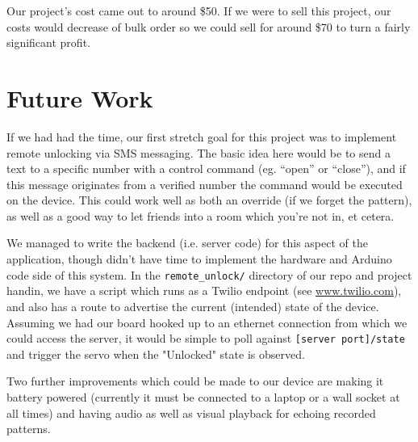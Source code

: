 \documentclass[11pt]{article}			%
\begin{document}
Our project's cost came out to around \$50. If we were to sell this project, our costs would decrease of bulk order so we could sell for around \$70 to turn a fairly significant profit.

\section{Future Work}

If we had had the time, our first stretch goal for this project was to implement remote unlocking via SMS messaging. The basic idea here would be to send a text to a specific number with a control command (eg. ``open'' or ``close''), and if this message originates from a verified number the command would be executed on the device. This could work well as both an override (if we forget the pattern), as well as a good way to let friends into a room which you're not in, et cetera.

We managed to write the backend (i.e. server code) for this aspect of the application, though didn't have time to implement the hardware and Arduino code side of this system. In the \verb|remote_unlock/| directory of our repo and project handin, we have a script which runs as a Twilio endpoint (see \url{www.twilio.com}), and also has a route to advertise the current (intended) state of the device. Assuming we had our board hooked up to an ethernet connection from which we could access the server, it would be simple to poll against \verb|[server port]/state| and trigger the servo when the "Unlocked" state is observed.

Two further improvements which could be made to our device are making it battery powered (currently it must be connected to a laptop or a wall socket at all times) and having audio as well as visual playback for echoing recorded patterns.
\end{document}

